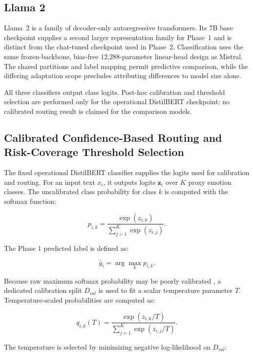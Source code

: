 \documentclass{ieeeaccess}
\begin{document}
\subsection{Llama 2}

Llama~2 \cite{ref14} is a family of decoder-only autoregressive transformers. Its 7B base checkpoint supplies a second larger representation family for Phase~1 and is distinct from the chat-tuned checkpoint used in Phase~2. Classification uses the same frozen-backbone, bias-free 12,288-parameter linear-head design as Mistral. The shared partitions and label mapping permit predictive comparison, while the differing adaptation scope precludes attributing differences to model size alone.

All three classifiers output class logits. Post-hoc calibration and threshold selection are performed only for the operational DistilBERT checkpoint; no calibrated routing result is claimed for the comparison models.

\subsection{Calibrated Confidence-Based Routing and Risk-Coverage Threshold Selection}

The fixed operational DistilBERT classifier supplies the logits used for calibration and routing. For an input text $x_i$, it outputs logits $\mathbf{z}_i$ over $K$ proxy emotion classes. The uncalibrated class probability for class $k$ is computed with the softmax function:

\begin{equation}
p_{i,k}=\frac{\exp(z_{i,k})}{\sum_{j=1}^{K}\exp(z_{i,j})}.
\end{equation}

The Phase 1 predicted label is defined as:

\begin{equation}
\hat{y}_i = \arg\max_k p_{i,k}.
\end{equation}

Because raw maximum softmax probability may be poorly calibrated \cite{ref15}, a dedicated calibration split $D_{cal}$ is used to fit a scalar temperature parameter $T$. Temperature-scaled probabilities are computed as:

\begin{equation}
q_{i,k}(T)=
\frac{\exp(z_{i,k}/T)}
{\sum_{j=1}^{K}\exp(z_{i,j}/T)}.
\end{equation}

The temperature is selected by minimizing negative log-likelihood on $D_{cal}$:
\end{document}
